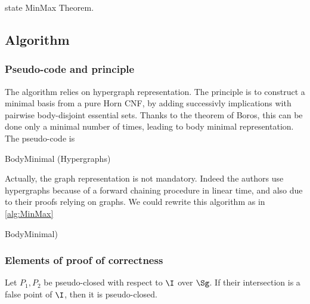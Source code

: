 state MinMax Theorem.

\subsection{Algorithm}
\subsubsection{Pseudo-code and principle}

The algorithm relies on hypergraph representation. The principle is to construct
a minimal basis from a pure Horn CNF, by adding successivly implications with 
pairwise body-disjoint essential sets. Thanks to the theorem of Boros, this can
be done only a minimal number of times, leading to body minimal representation.
The pseudo-code is 

\begin{algorithm}
	
\caption{BodyMinimal (Hypergraphs)}
\label{alg:MinMaxHyp}
\end{algorithm}

\noindent Actually, the graph representation is not mandatory. Indeed the 
authors use hypergraphs because of a forward chaining procedure in linear time,
and also due to their proofs relying on graphs. We could rewrite this algorithm
as in \ref{alg:MinMax}

\begin{algorithm}[H]


\caption{BodyMinimal)}
\label{alg:MinMax}
\end{algorithm}	

\subsubsection{Elements of proof of correctness}

\begin{proposition} \label{prop:let.pc_inter}
 Let $P_1, P_2$ be pseudo-closed with respect to $\I$ over 
$\Sg$. If their intersection is a false point of $\I$, then it is pseudo-closed.
	
\end{proposition}

